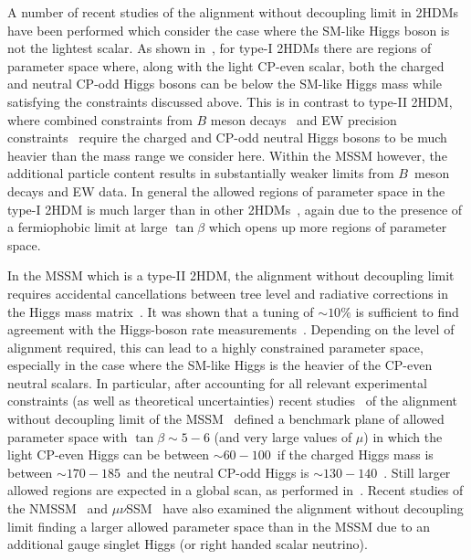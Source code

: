 \documentclass[../report.tex]{subfiles}
\begin{document}
\label{sec:models}

A number of recent studies of the alignment without decoupling limit in
2HDMs have been performed which consider the case where the SM-like
Higgs boson is not the lightest scalar. As shown
in~\cite{Ilisie:2014hea,Bernon:2015wef,Enberg:2016ygw,Arhrib:2017wmo,Arbey:2017gmh,Bhatia:2017ttp,Fox:2017uwr,Haber:2017erd,Haisch:2017gql},
for type-I 2HDMs there are regions of parameter space where, along with
the light CP-even scalar, both the charged and neutral CP-odd Higgs
bosons can be below the SM-like Higgs mass while satisfying the
constraints discussed above. This is in contrast to type-II 2HDM,
where combined constraints from $B$ meson
decays~\cite{Misiak:2015xwa} and EW precision
constraints~\cite{Peskin:1991sw} require the charged and CP-odd neutral
Higgs bosons to be much heavier than the mass range we consider here. Within the MSSM however, the additional particle content results in
  substantially weaker limits from $B$~meson decays and EW data.
In general the allowed regions of parameter space in the type-I 2HDM is
much larger than in other 2HDMs~\cite{Bernon:2015wef,Haber:2017erd},
again due to the presence of a fermiophobic limit at large $\tan\beta$
which opens up more regions of parameter space. 

In the MSSM which is a type-II 2HDM, the alignment without decoupling
limit~\cite{Carena:2013ooa} requires accidental cancellations between
tree level and radiative corrections in the Higgs mass
matrix~\cite{Bechtle:2016kui,Haber:2017erd}. It was shown that a tuning of $\sim 10\%$ is sufficient to find agreement with the Higgs-boson rate measurements~\cite{Bechtle:2016kui}. Depending on the level of alignment required, this can lead to a highly constrained parameter space, especially in the case where the SM-like Higgs is the heavier of the CP-even neutral scalars. In particular, after accounting for all relevant experimental constraints (as well as theoretical uncertainties) recent studies~\cite{Bahl:2018zmf} of the alignment without decoupling limit of the MSSM~\cite{Carena:2013ooa} defined a benchmark plane of allowed parameter space with $\tan\beta \sim 5 - 6$ (and very large values of $\mu$) in which the light CP-even Higgs can be between  $\sim 60 - 100$~\UGeV if the charged Higgs mass is between $\sim 170 - 185$~\UGeV and the neutral CP-odd Higgs is $\sim 130 - 140$~\UGeV. Still larger allowed regions are expected in a global scan, as performed in~\cite{Bechtle:2016kui}.
Recent studies of the NMSSM~\cite{Carena:2015moc,Domingo:2018uim} and
$\mu\nu$SSM~\cite{Biekotter:2017xmf} have also examined the alignment
without decoupling limit finding a larger allowed parameter space than in the
MSSM due to an additional gauge singlet Higgs (or right handed scalar
neutrino). 
\end{document}
